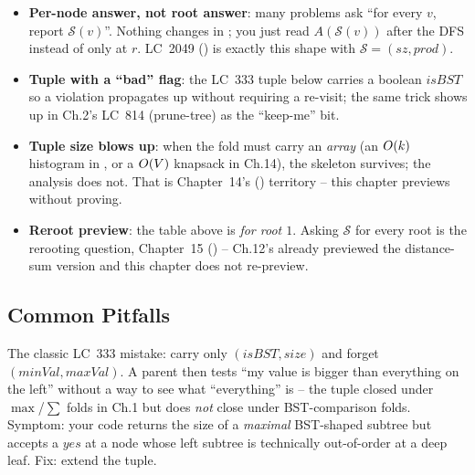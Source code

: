 \begin{itemize}[nosep]
  \item \textbf{Per-node answer, not root answer}: many problems ask
        ``for every $v$, report $\mathcal S(v)$''. Nothing changes in
        ; you just read $A(\mathcal S(v))$ after the DFS
        instead of only at $r$. LC~2049 () is exactly this shape
        with $\mathcal S=(\mathit{sz},\mathit{prod})$. \hfill{}
  \item \textbf{Tuple with a ``bad'' flag}: the LC~333 tuple below carries a
        boolean $\mathit{isBST}$ so a violation propagates up without
        requiring a re-visit; the same trick shows up in Ch.2's LC~814
        (prune-tree) as the ``keep-me'' bit. \hfill{}
  \item \textbf{Tuple size blows up}: when the fold must carry an
        \emph{array} (an $O(k)$ histogram in , or a
        $O(V)$ knapsack in Ch.14), the skeleton survives; the analysis
        does not. That is Chapter~14's () territory -- this chapter
        previews without proving. \hfill{}
  \item \textbf{Reroot preview}: the table above is \emph{for root $1$}. Asking
        $\mathcal S$ for every root is the rerooting question, Chapter~15
        () -- Ch.12's  already previewed the
        distance-sum version and this chapter does not re-preview.
        \hfill{}
\end{itemize}

\subsection{Common Pitfalls}

\begin{warningbox}
The classic LC~333 mistake: carry only $(\mathit{isBST},\mathit{size})$ and
forget $(\mathit{minVal},\mathit{maxVal})$. A parent then tests ``my value is
bigger than everything on the left'' without a way to see what ``everything''
is -- the tuple closed under $\max$/$\sum$ folds in Ch.1 but does \emph{not}
close under BST-comparison folds. Symptom: your code returns the size of a
\emph{maximal} BST-shaped subtree but accepts a $\mathit{yes}$ at a node
whose left subtree is technically out-of-order at a deep leaf. Fix: extend
the tuple.
\end{warningbox}

